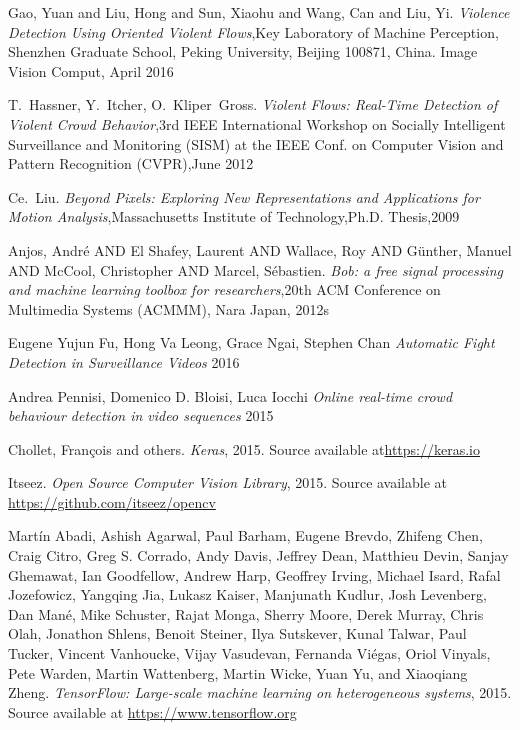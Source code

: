 \cleardoublepage
{}
{}
\begin{thebibliography}{99}
Gao, Yuan and Liu, Hong and Sun, Xiaohu and Wang, Can and Liu, Yi. \emph{Violence Detection Using Oriented Violent Flows},Key Laboratory of Machine Perception, Shenzhen Graduate School, Peking University, Beijing 100871, China. Image Vision Comput, April 2016

T.~Hassner, Y.~Itcher, O.~Kliper~Gross. \emph{Violent Flows: Real-Time Detection of Violent Crowd Behavior},3rd IEEE International Workshop on Socially Intelligent Surveillance and Monitoring (SISM) at the IEEE Conf. on Computer Vision and Pattern Recognition (CVPR),June 2012

Ce.~Liu. \emph{Beyond Pixels: Exploring New Representations and Applications for Motion Analysis},Massachusetts Institute of Technology,Ph.D. Thesis,2009

Anjos, Andr\'e AND El Shafey, Laurent AND Wallace, Roy AND G\"unther, Manuel AND McCool, Christopher AND Marcel, S\'ebastien. \emph{Bob: a free signal processing and machine learning toolbox for researchers},20th ACM Conference on Multimedia Systems (ACMMM), Nara Japan, 2012s

Eugene Yujun Fu, Hong Va Leong, Grace Ngai, Stephen Chan \emph{Automatic Fight Detection in Surveillance Videos} 2016

Andrea Pennisi, Domenico D. Bloisi, Luca Iocchi \emph{Online real-time crowd behaviour detection in video sequences} 2015

Chollet, Fran\c{c}ois and others. \emph{Keras}, 2015. Source available at\url{https://keras.io}

Itseez. \emph{Open Source Computer Vision Library}, 2015. Source available at \url{https://github.com/itseez/opencv}

Martín Abadi, Ashish Agarwal, Paul Barham, Eugene Brevdo,
Zhifeng Chen, Craig Citro, Greg S. Corrado, Andy Davis,
Jeffrey Dean, Matthieu Devin, Sanjay Ghemawat, Ian Goodfellow,
Andrew Harp, Geoffrey Irving, Michael Isard, Rafal Jozefowicz, Yangqing Jia,
Lukasz Kaiser, Manjunath Kudlur, Josh Levenberg, Dan Mané, Mike Schuster,
Rajat Monga, Sherry Moore, Derek Murray, Chris Olah, Jonathon Shlens,
Benoit Steiner, Ilya Sutskever, Kunal Talwar, Paul Tucker,
Vincent Vanhoucke, Vijay Vasudevan, Fernanda Viégas,
Oriol Vinyals, Pete Warden, Martin Wattenberg, Martin Wicke,
Yuan Yu, and Xiaoqiang Zheng.
\emph{TensorFlow: Large-scale machine learning on heterogeneous systems}, 2015. Source available at \url{ https://www.tensorflow.org}


\end{thebibliography}

